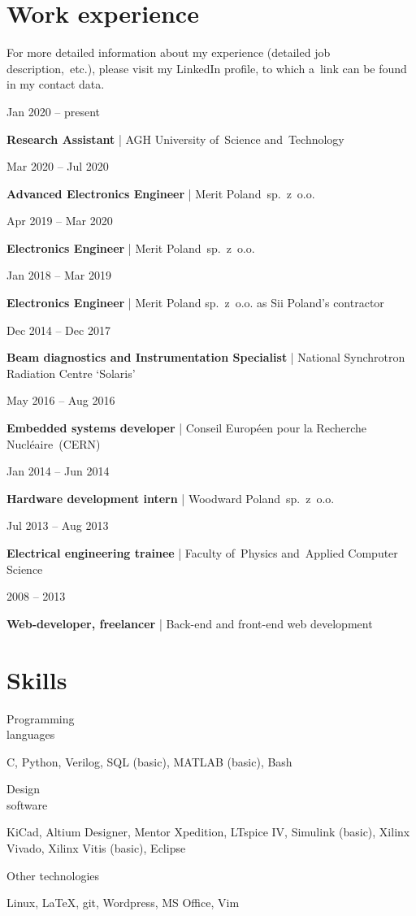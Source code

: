 \documentclass[11pt,a4paper,sans]{article}
\newcommand{\cvexpdateslimitem}[3]{

	\noindent
	\begin{minipage}[t]{0.22\linewidth}
		#1
	\end{minipage}
	\hfill
	\begin{minipage}[t]{0.76\linewidth}
		\begin{flushleft}
			{\bfseries #2} | #3
		\end{flushleft}
	\end{minipage}
	\vspace{.5\baselineskip}

}
\newcommand{\cvskillsitem}[2]{

	\noindent
	\begin{minipage}{0.21\linewidth}
		\begin{flushleft}
			#1
		\end{flushleft}
	\end{minipage}
	\hfill
	\begin{minipage}{0.766\linewidth}

		\begin{flushleft}
			#2
		\end{flushleft}
	\end{minipage}
	\vspace{.65\baselineskip}
}
\begin{document}
	\section{Work experience}

	For more detailed information about my experience (detailed job
	description,~etc.), please visit my LinkedIn profile, to which a~link can
	be found in my contact data.
	\vspace{1\baselineskip}

	\cvexpdateslimitem
		{Jan 2020 -- present}
		{Research Assistant}
		{AGH University of~Science and~Technology}

	\cvexpdateslimitem
		{Mar 2020 -- Jul 2020}
		{Advanced Electronics Engineer}
		{Merit Poland~sp.~z~o.o.}

	\cvexpdateslimitem
		{Apr 2019 -- Mar 2020}
		{Electronics Engineer}
		{Merit Poland~sp.~z~o.o.}

	\cvexpdateslimitem
		{Jan 2018 -- Mar 2019}
		{Electronics Engineer}
		{Merit Poland sp.~z~o.o. as Sii Poland's contractor}

	\cvexpdateslimitem
		{Dec 2014 -- Dec 2017}
		{Beam diagnostics and Instrumentation Specialist}
		{National Synchrotron Radiation Centre `Solaris'}

	\cvexpdateslimitem
		{May 2016 -- Aug 2016}
		{Embedded systems developer}
		{Conseil Européen pour la Recherche Nucléaire~(CERN)}

	\cvexpdateslimitem
		{Jan 2014 -- Jun 2014}
		{Hardware development intern}
		{Woodward Poland~sp.~z~o.o.}

	\cvexpdateslimitem
		{Jul 2013 -- Aug 2013}
		{Electrical engineering trainee}
		{Faculty of~Physics	and~Applied Computer Science}

	\cvexpdateslimitem
		{2008 -- 2013}
		{Web-developer, freelancer}
		{Back-end and front-end web development}

	\section{Skills}
	\cvskillsitem
	{Programming\\languages}
	{C, Python, Verilog, SQL (basic), MATLAB (basic),
	Bash}

	\cvskillsitem
	{Design\\software}
	{KiCad, Altium Designer, Mentor Xpedition, LTspice IV, Simulink (basic), Xilinx
	Vivado, Xilinx Vitis (basic), Eclipse}

	\cvskillsitem
	{Other technologies}
	{Linux, \LaTeX, git, Wordpress, MS Office, Vim}
\end{document}
